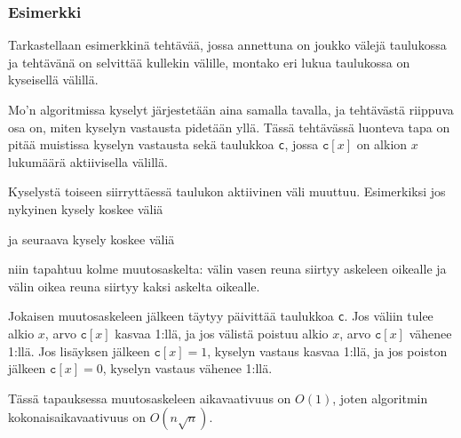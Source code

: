 \subsubsection*{Esimerkki}

Tarkastellaan esimerkkinä tehtävää,
jossa annettuna on joukko välejä taulukossa
ja  tehtävänä on selvittää kullekin välille,
montako eri lukua taulukossa on kyseisellä välillä.

Mo'n algoritmissa kyselyt järjestetään aina samalla
tavalla, ja tehtävästä riippuva osa on,
miten kyselyn vastausta pidetään yllä.
Tässä tehtävässä luonteva tapa on
pitää muistissa kyselyn vastausta sekä
taulukkoa \texttt{c}, jossa $\texttt{c}[x]$
on alkion $x$ lukumäärä aktiivisella välillä.

Kyselystä toiseen siirryttäessä taulukon aktiivinen
väli muuttuu. Esimerkiksi jos nykyinen kysely koskee väliä

\begin{center}
\end{center}
ja seuraava kysely koskee väliä
\begin{center}
\end{center}
niin tapahtuu kolme muutosaskelta:
välin vasen reuna siirtyy askeleen oikealle
ja välin oikea reuna siirtyy kaksi askelta oikealle.

Jokaisen muutosaskeleen jälkeen täytyy
päivittää taulukkoa \texttt{c}.
Jos väliin tulee alkio $x$,
arvo $\texttt{c}[x]$ kasvaa 1:llä,
ja jos välistä poistuu alkio $x$,
arvo $\texttt{c}[x]$ vähenee 1:llä.
Jos lisäyksen jälkeen $\texttt{c}[x]=1$,
kyselyn vastaus kasvaa 1:llä,
ja jos poiston jälkeen $\texttt{c}[x]=0$,
kyselyn vastaus vähenee 1:llä.

Tässä tapauksessa muutosaskeleen aikavaativuus on $O(1)$,
joten algoritmin kokonaisaikavaativuus on $O(n \sqrt n)$.


